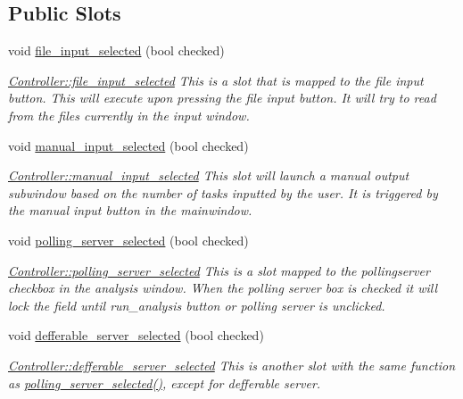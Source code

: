 \subsection*{Public Slots}
\begin{DoxyCompactItemize}
\item 
void \hyperlink{classController_a7db4c90e6055889682d8521f48c693f6}{file\+\_\+input\+\_\+selected} (bool checked)
\begin{DoxyCompactList}\small\item\em \hyperlink{classController_a7db4c90e6055889682d8521f48c693f6}{Controller\+::file\+\_\+input\+\_\+selected} This is a slot that is mapped to the file input button. This will execute upon pressing the file input button. It will try to read from the files currently in the input window. \end{DoxyCompactList}\item 
void \hyperlink{classController_a2daeb91e3a6c79ddfa46fd04770012ff}{manual\+\_\+input\+\_\+selected} (bool checked)
\begin{DoxyCompactList}\small\item\em \hyperlink{classController_a2daeb91e3a6c79ddfa46fd04770012ff}{Controller\+::manual\+\_\+input\+\_\+selected} This slot will launch a manual output subwindow based on the number of tasks inputted by the user. It is triggered by the manual input button in the mainwindow. \end{DoxyCompactList}\item 
void \hyperlink{classController_aeca721bb54b3495d2a490d6f658799a5}{polling\+\_\+server\+\_\+selected} (bool checked)
\begin{DoxyCompactList}\small\item\em \hyperlink{classController_aeca721bb54b3495d2a490d6f658799a5}{Controller\+::polling\+\_\+server\+\_\+selected} This is a slot mapped to the pollingserver checkbox in the analysis window. When the polling server box is checked it will lock the field until run\+\_\+analysis button or polling server is unclicked. \end{DoxyCompactList}\item 
void \hyperlink{classController_a1c4186c6a1366dc848cdeb68261dc12e}{defferable\+\_\+server\+\_\+selected} (bool checked)
\begin{DoxyCompactList}\small\item\em \hyperlink{classController_a1c4186c6a1366dc848cdeb68261dc12e}{Controller\+::defferable\+\_\+server\+\_\+selected} This is another slot with the same function as \hyperlink{classController_aeca721bb54b3495d2a490d6f658799a5}{polling\+\_\+server\+\_\+selected()}, except for defferable server. \end{DoxyCompactList}\item 

\end{DoxyCompactItemize}
